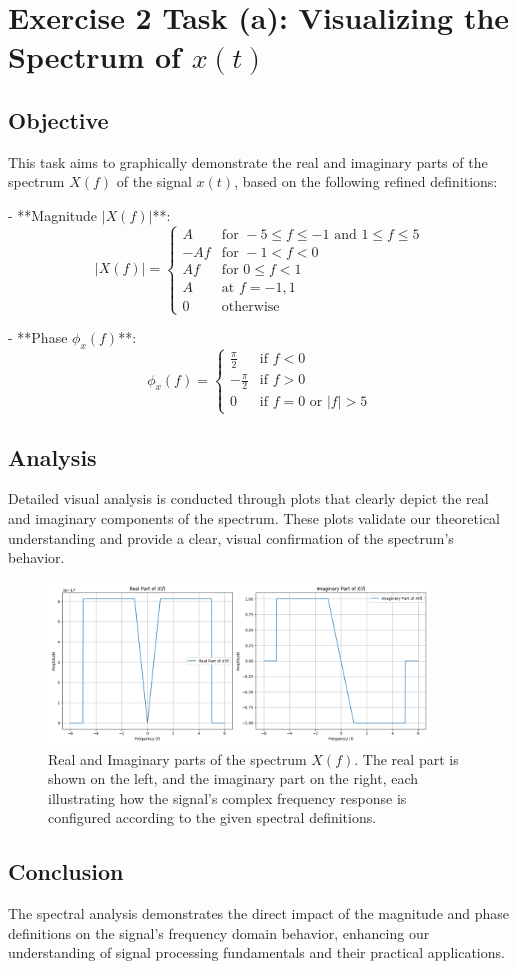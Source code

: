 \item[(a)]
\section*{Exercise 2 Task (a): Visualizing the Spectrum of \(x(t)\)}

\subsection*{Objective}
This task aims to graphically demonstrate the real and imaginary parts of the spectrum \(X(f)\) of the signal \(x(t)\), based on the following refined definitions:

- **Magnitude \(|X(f)|\)**:
  \[
  |X(f)| =
  \begin{cases}
  A & \text{for } -5 \leq f \leq -1 \text{ and } 1 \leq f \leq 5 \\
  -Af & \text{for } -1 < f < 0 \\
  Af & \text{for } 0 \leq f < 1 \\
  A & \text{at } f = -1, 1 \\
  0 & \text{otherwise}
  \end{cases}
  \]

- **Phase \(\phi_x(f)\)**:
  \[
  \phi_x(f) =
  \begin{cases}
  \frac{\pi}{2} & \text{if } f < 0 \\
  -\frac{\pi}{2} & \text{if } f > 0 \\
  0 & \text{if } f = 0 \text{ or } |f| > 5
  \end{cases}
  \]

\subsection*{Analysis}
Detailed visual analysis is conducted through plots that clearly depict the real and imaginary components of the spectrum. These plots validate our theoretical understanding and provide a clear, visual confirmation of the spectrum's behavior.

\begin{figure}[h]
    \centering
    \includegraphics[width=0.9\textwidth]{fig/ex2_task_a_spectrum_analysis.png}
    \caption{Real and Imaginary parts of the spectrum \(X(f)\). The real part is shown on the left, and the imaginary part on the right, each illustrating how the signal's complex frequency response is configured according to the given spectral definitions.}
    \label{fig:spectrum_analysis_a}
\end{figure}

\subsection*{Conclusion}
The spectral analysis demonstrates the direct impact of the magnitude and phase definitions on the signal's frequency domain behavior, enhancing our understanding of signal processing fundamentals and their practical applications.
